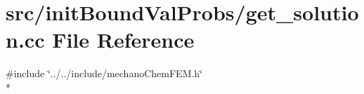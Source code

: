 \section{src/init\-Bound\-Val\-Probs/get\-\_\-solution.cc File Reference}
\label{get__solution_8cc}
{\ttfamily \#include \char`\"{}../../include/mechano\-Chem\-F\-E\-M.\-h\char`\"{}}\\*
